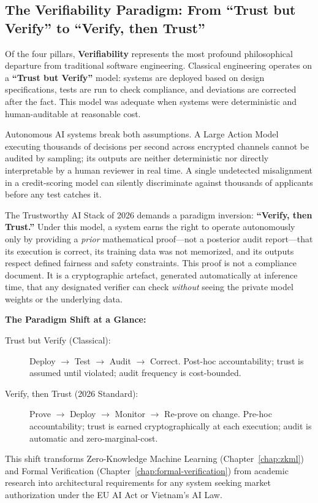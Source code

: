 \subsection{The Verifiability Paradigm: From ``Trust but Verify'' to ``Verify, then Trust''}
\label{subsec:verify_then_trust}

Of the four pillars, \textbf{Verifiability} represents the most profound philosophical departure from traditional software engineering. Classical engineering operates on a \textbf{``Trust but Verify''} model: systems are deployed based on design specifications, tests are run to check compliance, and deviations are corrected after the fact. This model was adequate when systems were deterministic and human-auditable at reasonable cost.

Autonomous AI systems break both assumptions. A Large Action Model executing thousands of decisions per second across encrypted channels cannot be audited by sampling; its outputs are neither deterministic nor directly interpretable by a human reviewer in real time. A single undetected misalignment in a credit-scoring model can silently discriminate against thousands of applicants before any test catches it.

The Trustworthy AI Stack of 2026 demands a paradigm inversion: \textbf{``Verify, then Trust.''} Under this model, a system earns the right to operate autonomously only by providing a \emph{prior} mathematical proof---not a posterior audit report---that its execution is correct, its training data was not memorized, and its outputs respect defined fairness and safety constraints. This proof is not a compliance document. It is a cryptographic artefact, generated automatically at inference time, that any designated verifier can check \emph{without} seeing the private model weights or the underlying data.

\begin{svgraybox}
\textbf{The Paradigm Shift at a Glance:}
\begin{description}
  \item[Trust but Verify (Classical):] Deploy $\to$ Test $\to$ Audit $\to$ Correct. Post-hoc accountability; trust is assumed until violated; audit frequency is cost-bounded.
  \item[Verify, then Trust (2026 Standard):] Prove $\to$ Deploy $\to$ Monitor $\to$ Re-prove on change. Pre-hoc accountability; trust is earned cryptographically at each execution; audit is automatic and zero-marginal-cost.
\end{description}
This shift transforms Zero-Knowledge Machine Learning (Chapter~\ref{chap:zkml}) and Formal Verification (Chapter~\ref{chap:formal-verification}) from academic research into architectural requirements for any system seeking market authorization under the EU AI Act or Vietnam's AI Law.
\end{svgraybox}

